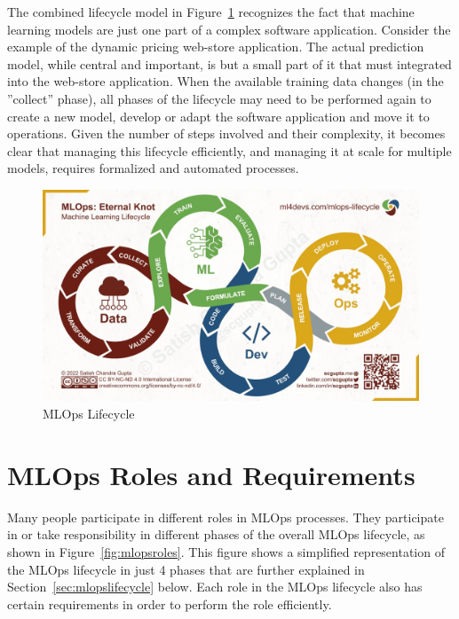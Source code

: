 The combined lifecycle model in Figure~\ref{fig:mlopslifecycle} recognizes the fact that machine learning models are just one part of a complex software application. Consider the example of the dynamic pricing web-store application. The actual prediction model, while central and important, is but a small part of it that must integrated into the web-store application. When the available training data changes (in the ''collect'' phase), all phases of the lifecycle may need to be performed again to create a new model, develop or adapt the software application and move it to operations. Given the number of steps involved and their complexity, it becomes clear that managing this lifecycle efficiently, and managing it at scale for multiple models, requires formalized and automated processes.

\begin{figure}
\centering
\includegraphics[width=\textwidth]{mlops2.jpeg}
\caption{MLOps Lifecycle}
\label{fig:mlopslifecycle}
\end{figure}

\FloatBarrier

\section{MLOps Roles and Requirements}

Many people participate in different roles in MLOps processes. They participate in or take responsibility in different phases of the overall MLOps lifecycle, as shown in Figure~\ref{fig:mlopsroles}. This figure shows a simplified representation of the MLOps lifecycle in just 4 phases that are further explained in Section~\ref{sec:mlopslifecycle} below. Each role in the MLOps lifecycle also has certain requirements in order to perform the role efficiently.


